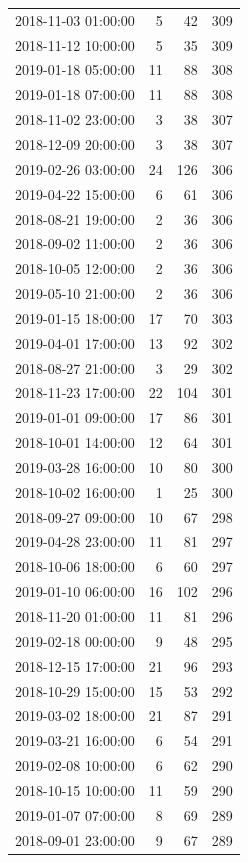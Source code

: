 \begin{tabular}{lrrr}
2018-11-03 01:00:00 & 5 & 42 & 309 \\
2018-11-12 10:00:00 & 5 & 35 & 309 \\
2019-01-18 05:00:00 & 11 & 88 & 308 \\
2019-01-18 07:00:00 & 11 & 88 & 308 \\
2018-11-02 23:00:00 & 3 & 38 & 307 \\
2018-12-09 20:00:00 & 3 & 38 & 307 \\
2019-02-26 03:00:00 & 24 & 126 & 306 \\
2019-04-22 15:00:00 & 6 & 61 & 306 \\
2018-08-21 19:00:00 & 2 & 36 & 306 \\
2018-09-02 11:00:00 & 2 & 36 & 306 \\
2018-10-05 12:00:00 & 2 & 36 & 306 \\
2019-05-10 21:00:00 & 2 & 36 & 306 \\
2019-01-15 18:00:00 & 17 & 70 & 303 \\
2019-04-01 17:00:00 & 13 & 92 & 302 \\
2018-08-27 21:00:00 & 3 & 29 & 302 \\
2018-11-23 17:00:00 & 22 & 104 & 301 \\
2019-01-01 09:00:00 & 17 & 86 & 301 \\
2018-10-01 14:00:00 & 12 & 64 & 301 \\
2019-03-28 16:00:00 & 10 & 80 & 300 \\
2018-10-02 16:00:00 & 1 & 25 & 300 \\
2018-09-27 09:00:00 & 10 & 67 & 298 \\
2019-04-28 23:00:00 & 11 & 81 & 297 \\
2018-10-06 18:00:00 & 6 & 60 & 297 \\
2019-01-10 06:00:00 & 16 & 102 & 296 \\
2018-11-20 01:00:00 & 11 & 81 & 296 \\
2019-02-18 00:00:00 & 9 & 48 & 295 \\
2018-12-15 17:00:00 & 21 & 96 & 293 \\
2018-10-29 15:00:00 & 15 & 53 & 292 \\
2019-03-02 18:00:00 & 21 & 87 & 291 \\
2019-03-21 16:00:00 & 6 & 54 & 291 \\
2019-02-08 10:00:00 & 6 & 62 & 290 \\
2018-10-15 10:00:00 & 11 & 59 & 290 \\
2019-01-07 07:00:00 & 8 & 69 & 289 \\
2018-09-01 23:00:00 & 9 & 67 & 289 \\

\end{tabular}
